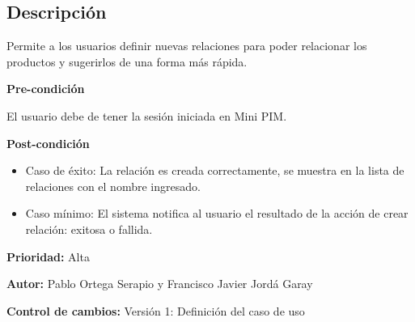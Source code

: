 
\subsection*{Descripción}
Permite a los usuarios definir nuevas relaciones para poder relacionar los productos y sugerirlos de una forma más rápida.\par
\vspace{0.15cm}

\textbf{Pre-condición}\par
El usuario debe de tener la sesión iniciada en Mini PIM.\par
\vspace{0.15cm}

\textbf{Post-condición}
\begin{itemize}
    \item Caso de éxito: La relación es creada correctamente, se muestra en la lista de relaciones con el nombre ingresado.
    \item Caso mínimo: El sistema notifica al usuario el resultado de la acción de crear relación: exitosa o fallida.
\end{itemize}

\textbf{Prioridad: }
Alta
\vspace{0.15cm}

\textbf{Autor: }
Pablo Ortega Serapio y Francisco Javier Jordá Garay\par
\vspace{0.15cm}

\textbf{Control de cambios: } Versión 1: Definición del caso de uso

